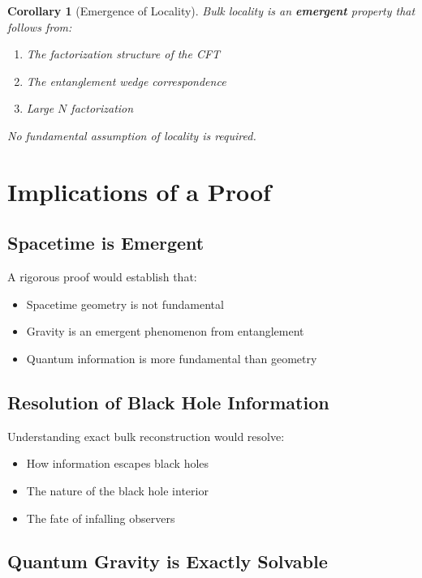 \documentclass[12pt,a4paper]{article}
\newtheorem{corollary}[theorem]{Corollary}
\begin{document}
\begin{corollary}[Emergence of Locality]
Bulk locality is an \textbf{emergent} property that follows from:
\begin{enumerate}
    \item The factorization structure of the CFT
    \item The entanglement wedge correspondence
    \item Large $N$ factorization
\end{enumerate}
No fundamental assumption of locality is required.
\end{corollary}

\section{Implications of a Proof}

\subsection{Spacetime is Emergent}

A rigorous proof would establish that:
\begin{itemize}
    \item Spacetime geometry is not fundamental
    \item Gravity is an emergent phenomenon from entanglement
    \item Quantum information is more fundamental than geometry
\end{itemize}

\subsection{Resolution of Black Hole Information}

Understanding exact bulk reconstruction would resolve:
\begin{itemize}
    \item How information escapes black holes
    \item The nature of the black hole interior
    \item The fate of infalling observers
\end{itemize}

\subsection{Quantum Gravity is Exactly Solvable}
\end{document}
